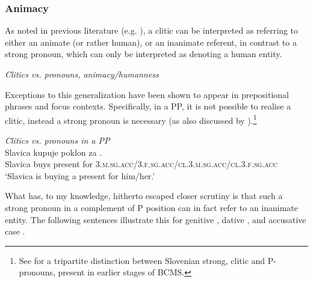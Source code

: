 \documentclass[output=paper,colorlinks,citecolor=brown]{langscibook}
\begin{document}
\subsubsection{Animacy}\label{subsubsec:animacy}

As noted in previous literature (e.g. \citealt{despic11}), a clitic can be interpreted as referring to either an animate (or rather human), or an inanimate referent, in contrast to a strong pronoun, which can only be interpreted as denoting a human entity.  

\ea \label {humannonhuman}\textit{Clitics vs. pronouns, animacy/humanness  \citep[240]{despic11}}
\z \z

\noindent Exceptions to this generalization have been shown to appear in prepositional phrases and focus contexts. Specifically, in a PP, it is not possible to realise a clitic, instead a strong pronoun is necessary  (as also discussed by \citealt{abels-phases,milicevbeslin19}).\footnote{\label{footnotetripartitedivision}See \citet{stegovec19} for a tripartite distinction between Slovenian strong, clitic and P-pronouns, present in earlier stages of BCMS.}

\newpage
\ea \label{cliticpronounPP}\textit{Clitics vs. pronouns in a PP}\\
\gll Slavica kupuje poklon za .\\ 
Slavica buys present for \textsc{3.m.sg.acc}/\textsc{3.f.sg.acc}/\textsc{cl.3.m.sg.acc}/\textsc{cl.3.f.sg.acc}\\
\glt `Slavica is buying a present for him/her.'
\z

\noindent What has, to my knowledge, hitherto escaped closer scrutiny is that such a strong pronoun in a complement of P position can in fact refer to an inanimate entity. The following sentences illustrate this for genitive , dative , and accusative case .
\end{document}
